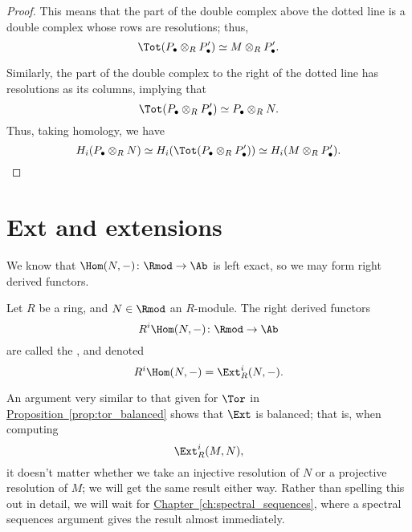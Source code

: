 \documentclass[main.tex]{subfiles}
\begin{document}
\begin{proof}
  This means that the part of the double complex above the dotted line is a double complex whose rows are resolutions; thus,
  \begin{equation*}
    \Tot(P_{\bullet} \otimes_{R} P'_{\bullet}) \simeq M \otimes_{R} P'_{\bullet}.
  \end{equation*}

  Similarly, the part of the double complex to the right of the dotted line has resolutions as its columns, implying that
  \begin{equation*}
    \Tot(P_{\bullet} \otimes_{R} P'_{\bullet}) \simeq P_{\bullet} \otimes_{R} N.
  \end{equation*}
  Thus, taking homology, we have
  \begin{equation*}
    H_{i}(P_{\bullet} \otimes_{R} N) \simeq H_{i}(\Tot(P_{\bullet} \otimes_{R} P'_{\bullet})) \simeq H_{i} (M \otimes_{R} P'_{\bullet}).
  \end{equation*}
\end{proof}


\section{Ext and extensions}
\label{sec:ext_and_extensions}

We know that $\Hom(N, -)\colon \Rmod \to \Ab$ is left exact, so we may form right derived functors.

\begin{definition}
  \label{def:ext_functor}
  Let $R$ be a ring, and $N \in \Rmod$ an $R$-module. The right derived functors
  \begin{equation*}
    R^{i}\Hom(N, -)\colon \Rmod \to \Ab
  \end{equation*}
  are called the , and denoted
  \begin{equation*}
    R^{i} \Hom(N, -) = \Ext_{R}^{i}(N, -).
  \end{equation*}
\end{definition}

An argument very similar to that given for $\Tor$ in \hyperref[prop:tor_balanced]{Proposition~\ref*{prop:tor_balanced}} shows that $\Ext$ is balanced; that is, when computing
\begin{equation*}
  \Ext^{i}_{R}(M, N),
\end{equation*}
it doesn't matter whether we take an injective resolution of $N$ or a projective resolution of $M$; we will get the same result either way. Rather than spelling this out in detail, we will wait for \hyperref[ch:spectral_sequences]{Chapter~\ref*{ch:spectral_sequences}}, where a spectral sequences argument gives the result almost immediately.
\end{document}
